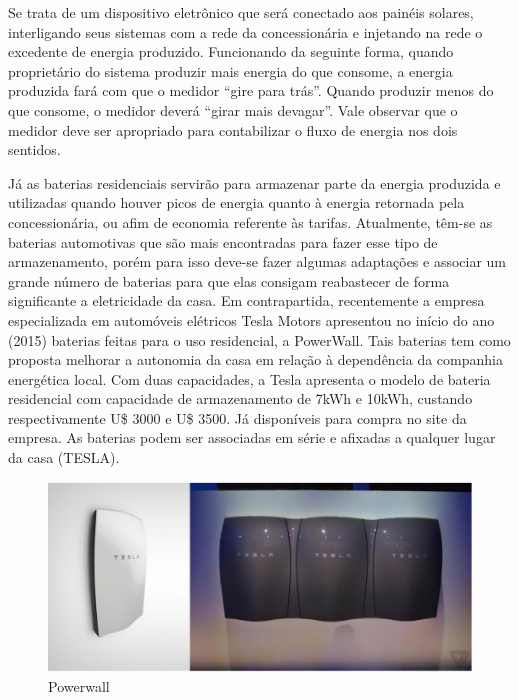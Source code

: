 	Se trata de um dispositivo eletrônico que será conectado aos painéis solares, interligando seus sistemas com a rede da concessionária e injetando na rede o excedente de energia produzido. Funcionando da seguinte forma, quando proprietário do sistema produzir mais energia do que consome, a energia produzida fará com que o medidor “gire para trás”. Quando produzir menos do que consome, o medidor deverá “girar mais devagar”. Vale observar que o medidor deve ser apropriado para contabilizar o fluxo de energia nos dois sentidos.

	Já as baterias residenciais servirão para armazenar parte da energia produzida e utilizadas quando houver picos de energia quanto à energia retornada pela concessionária, ou afim de economia referente às tarifas. Atualmente, têm-se as baterias automotivas que são mais encontradas para fazer esse tipo de armazenamento, porém para isso deve-se fazer algumas adaptações e associar um grande número de baterias para que elas consigam reabastecer de forma significante a eletricidade da casa. Em contrapartida, recentemente a empresa especializada em automóveis elétricos Tesla Motors apresentou no início do ano (2015) baterias feitas para o uso residencial, a PowerWall. Tais baterias tem como proposta melhorar a autonomia da casa em relação à dependência da companhia energética local. Com duas capacidades, a Tesla apresenta o modelo de bateria residencial com capacidade de armazenamento de 7kWh e 10kWh, custando respectivamente U\$ 3000 e U\$ 3500. Já disponíveis para compra no site da empresa. As baterias podem ser associadas em série e afixadas a qualquer lugar da casa (TESLA). 

\begin{figure}[H]
  \begin{center}
	\includegraphics[keepaspectratio,scale=1]{figuras/powerwall.eps}
	\caption{Powerwall}
  \end{center}
\end{figure}

